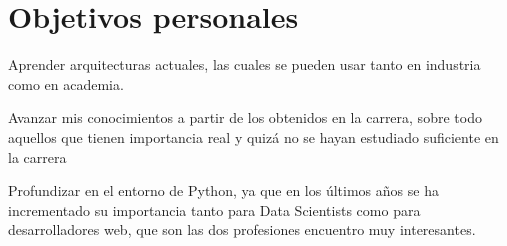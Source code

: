 \section{Objetivos personales}
\begin{list}{-}{}
\item Aprender arquitecturas actuales, las cuales se pueden usar tanto en industria como en academia.
\item Avanzar mis conocimientos a partir de los obtenidos en la carrera, sobre todo aquellos que tienen importancia real y quizá no se hayan estudiado suficiente en la carrera
\item Profundizar en el entorno de Python, ya que en los últimos años se ha incrementado su importancia tanto para Data Scientists como para desarrolladores web, que son las dos profesiones encuentro muy interesantes.
\end{list}

